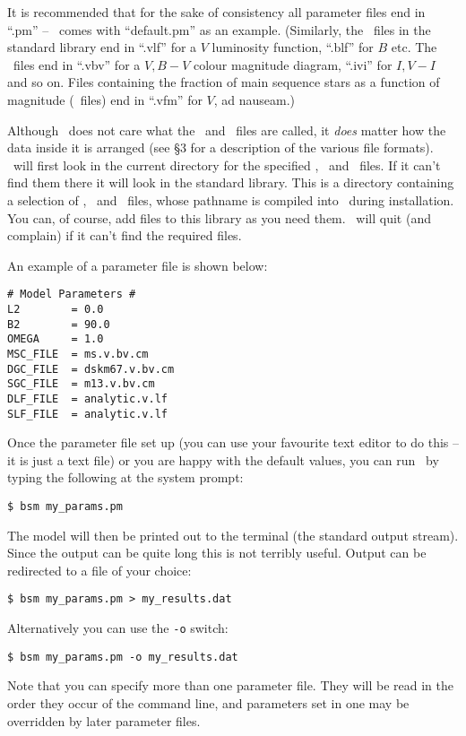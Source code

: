 \documentclass[11pt,twoside]{article}
\begin{document}
It is recommended that for the sake of consistency all parameter files end
in ``.pm'' -- \bsm\ comes with ``default.pm'' as an example. 
(Similarly, the \lf\ files in the standard library end in ``.vlf'' for a
$V$ luminosity function, ``.blf'' for $B$ etc. The \cmd\ files end in
``.vbv'' for a $V, B-V$ colour magnitude diagram, ``.ivi'' for $I, V-I$ and
so on. Files containing the fraction of main sequence stars as a
function of magnitude (\fms\ files) end in ``.vfm'' for $V$, ad nauseam.)

Although \bsm\ does not care what the \lf\ and \cmd\ files are called, it 
{\em does} matter how the data inside it is arranged (see \S3 for a description
of the various file formats). \bsm\ will first look in the current directory 
for the specified \lf, \cmd\ and \fms\ files. If it can't find them there it 
will look in the standard library. This is a directory containing a selection 
of \lf, \cmd\ and \fms\ files, whose pathname is compiled into \bsm\ during 
installation. You can, of course, add files to this library as you need them.
\bsm\ will quit (and complain) if it can't find the required files.

An example of a parameter file is shown below:
\begin{verbatim}
# Model Parameters #
L2        = 0.0
B2        = 90.0
OMEGA     = 1.0
MSC_FILE  = ms.v.bv.cm 
DGC_FILE  = dskm67.v.bv.cm
SGC_FILE  = m13.v.bv.cm
DLF_FILE  = analytic.v.lf
SLF_FILE  = analytic.v.lf
\end{verbatim}

Once the parameter file set up (you can use your favourite text editor to do 
this -- it is just a text file) or you are happy with the default values,
you can run \bsm\ by typing the following at the system prompt:
\begin{verbatim}
$ bsm my_params.pm
\end{verbatim}
The model will then be printed out to the terminal (the standard output
stream). Since the output can be quite long this is not terribly useful. 
Output can be redirected to a file of your choice:
\begin{verbatim}
$ bsm my_params.pm > my_results.dat
\end{verbatim}
Alternatively you can use the {\tt -o} switch:
\begin{verbatim}
$ bsm my_params.pm -o my_results.dat
\end{verbatim}
Note that you can specify more than one parameter file. They will be read in 
the order they occur of the command line, and parameters set in one may be
overridden by later parameter files.
\end{document}
